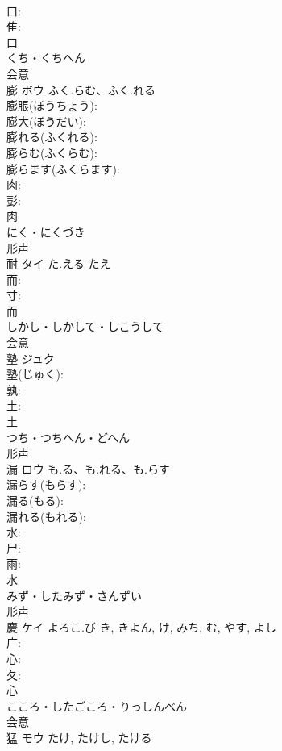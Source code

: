 \documentclass[8pt]{extreport}
\begin{document}
\begin{CJK}{UTF8}{min}
\\	口: 
\\	隹: 
\\	口	
\\	くち・くちへん	
\\	会意 
\\	膨	ボウ	ふく.らむ、ふく.れる		
\\	膨脹(ぼうちょう): 
\\	膨大(ぼうだい): 
\\	膨れる(ふくれる): 
\\	膨らむ(ふくらむ): 
\\	膨らます(ふくらます): 
\\	肉: 
\\	彭: 
\\	肉	
\\	にく・にくづき	
\\	形声 
\\	耐	タイ	た.える	たえ	
\\	而: 
\\	寸: 
\\	而	
\\	しかし・しかして・しこうして	
\\	会意 
\\	塾	ジュク			
\\	塾(じゅく): 
\\	孰: 
\\	土: 
\\	土	
\\	つち・つちへん・どへん	
\\	形声 
\\	漏	ロウ	も.る、も.れる、も.らす		
\\	漏らす(もらす): 
\\	漏る(もる): 
\\	漏れる(もれる): 
\\	水: 
\\	尸: 
\\	雨: 
\\	水	
\\	みず・したみず・さんずい	
\\	形声 
\\	慶	ケイ	よろこ.び	き, きよん, け, みち, む, やす, よし	
\\	广: 
\\	心: 
\\	夂: 
\\	心	
\\	こころ・したごころ・りっしんべん	
\\	会意 
\\	猛	モウ		たけ, たけし, たける	

\end{CJK}
\end{document}
